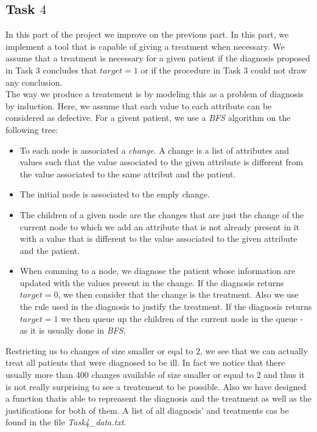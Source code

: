 \documentclass[french]{article}
\begin{document}
\subsection{Task $4$}
	In this part of the project we improve on the previous part. In this part, we implement a tool that is capable of giving a treatment when necessary. We assume that a treatment is necessary for a given patient if the diagnosis proposed in Task $3$ concludes that $target=1$ or if the procedure in Task $3$ could not draw any conclusion.\\
	The way we produce a treatement is by modeling this as a problem of diagnosis by induction. Here, we assume that each value to each attribute can be considered as defective. For a givent patient, we use a \emph{BFS} algorithm on the following tree:
	\begin{itemize}
		\item To each node is associated a \emph{change}. A change is a list of attributes and values such that the value associated to the given attribute is different from the value associated to the same attribut and the patient.
		\item The initial node is associated to the emply change.
		\item The children of a given node are the changes that are just the change of the current node to which we add an attribute that is not already present in it with a value that is different to the value associated to the given attribute and the patient.
		\item When comming to a node, we diagnose the patient whose information are updated with the values present in the change. If the diagnosis returns $target=0$, we then consider that the change is the treatment. Also we use the rule used in the diagnosis to justify the treatment. If the diagnosis returns $target=1$ we then queue up the children of the current node in the queue - as it is usually done in \emph{BFS}.
	\end{itemize}
Restricting us to changes of size smaller or eqal to $2$, we see that we can actually treat all patients that were diagnosed to be ill. In fact we notice that there usually more than $400$ changes available of size smaller or equal to $2$ and thus it is not really surprising to see a treatement to be possible. Also we have designed a function thatis able to repreasent the diagnosis and the treatment as well as the justifications for both of them. A list of all diagnosis' and treatments cas be found in the file \emph{Task4\_data.txt}.
\end{document}
